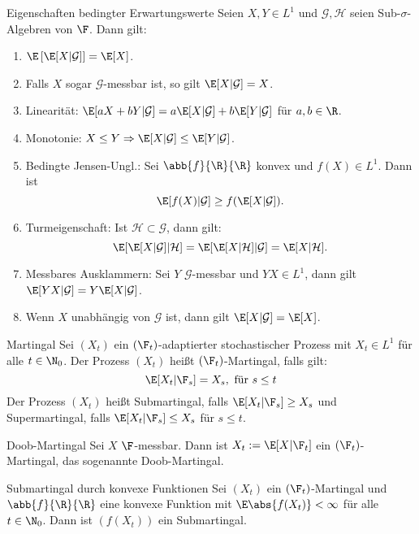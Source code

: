 \begin{karte}{Eigenschaften bedingter Erwartungswerte}
Seien \(X,Y\in L^1\) und \(\mathcal{G}, \mathcal{H}\) seien Sub-\(\sigma\)-Algebren von \(\F\). Dann gilt: 
\begin{enumerate}
    \item \(\E \left[\E[X|\mathcal{G}]\right] = \E[X]\).
    \item Falls \(X\) sogar \(\mathcal{G}\)-messbar ist, so gilt \(\E[X|\mathcal{G}] = X\).
    \item Linearität: \(\E[aX + bY|\mathcal{G}] = a\E[X|\mathcal{G}] + b\E[Y|\mathcal{G}]\) für \(a,b\in \R\).
    \item Monotonie: \(X \leq Y \Rightarrow \E[X|\mathcal{G}] \leq \E[Y|\mathcal{G}]\). 
    \item Bedingte Jensen-Ungl.: Sei \(\abb{f}{\R}{\R}\) konvex und \(f(X) \in L^1\). Dann ist 
    \[ \E[f(X) |\mathcal{G}] \geq f(\E[X|\mathcal{G}]). \]
    \item Turmeigenschaft: Ist \(\mathcal{H} \subset \mathcal{G}\), dann gilt: 
    \[ \E[ \E[X|\mathcal{G}] | \mathcal{H} ] = \E [\E[X | \mathcal{H}] | \mathcal{G}] = \E[X|\mathcal{H}]. \]
    \item Messbares Ausklammern: Sei \(Y\) \(\mathcal{G}\)-messbar und \(YX \in L^1\), dann gilt 
    \(\E[YX | \mathcal{G}] = Y \E[X|\mathcal{G}]\).
    \item Wenn \(X\) unabhängig von \(\mathcal{G}\) ist, dann gilt \(\E[X|\mathcal{G}] = \E[X]\).
\end{enumerate}
\end{karte}

\begin{karte}{Martingal}
Sei \((X_t)\) ein \((\F_t)\)-adaptierter stochastischer Prozess mit \(X_t \in L^1\) für alle 
\(t\in \N_0\). Der Prozess \((X_t)\) heißt \((\F_t)\)-Martingal, falls gilt: 
\[ \E[X_t|\F_s] = X_s, \text{ für }s \leq t \]
Der Prozess \((X_t)\) heißt Submartingal, falls \(\E[X_t|\F_s] \geq X_s\) 
und Supermartingal, falls \(\E[X_t|\F_s] \leq X_s\) für \(s\leq t\).
\end{karte}

\begin{karte}{Doob-Martingal}
Sei \(X\) \(\F\)-messbar. Dann ist \(X_t := \E[X|\F_t]\) ein \((\F_t)\)-Martingal, das sogenannte Doob-Martingal.
\end{karte}

\begin{karte}{Submartingal durch konvexe Funktionen}
Sei \((X_t)\) ein \((\F_t)\)-Martingal und \(\abb{f}{\R}{\R}\) eine konvexe Funktion mit 
\(\E \abs{f(X_t)} < \infty\) für alle \(t\in \N_0\). Dann ist 
\((f(X_t))\) ein Submartingal.
\end{karte}

